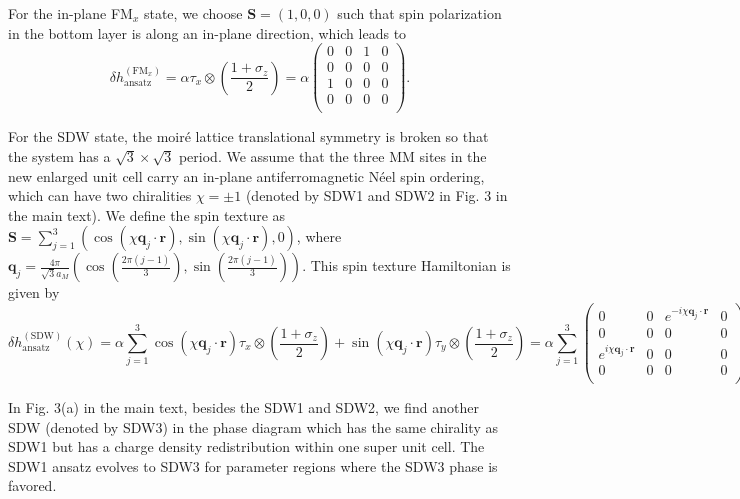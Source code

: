 \documentclass[aps,prl,onecolumn,superscriptaddress,longbibliography]{revtex4-2}
\begin{document}
For the in-plane FM$_x$ state,  we choose $ \bm{S}=\left( 1,0,0 \right)$ such that spin polarization in the bottom layer is along an in-plane direction, which leads to
\begin{equation}
    \delta h_{\text{ansatz}}^{(\text{FM}_x)}=\alpha \tau_x\otimes \left(\frac{1+\sigma_z}{2}\right)=\alpha 
    \begin{pmatrix}
        0 & 0 & 1 & 0\\
        0 & 0 & 0 & 0\\
        1 & 0 & 0 & 0\\
        0 & 0 & 0 & 0\\
    \end{pmatrix}.
\end{equation}

For the SDW state, the moir\'e lattice translational symmetry is broken so that the system has a $\sqrt{3}\times\sqrt{3}$ period. We assume that the three MM sites in the new enlarged unit cell carry an in-plane antiferromagnetic N\'eel spin ordering, which can have two chiralities $\chi=\pm 1$ (denoted by SDW1 and SDW2 in Fig. 3 in the main text). We define the spin texture as $\bm{S}=\sum_{j=1}^3 \left( \cos(\chi\bm{q}_j \cdot \bm{r}),\sin(\chi\bm{q}_j \cdot \bm{r}),0 \right)$, where $\bm{q}_j=\frac{4\pi}{\sqrt{3}a_M} \left( \cos(\frac{2\pi(j-1)}{3}), \sin(\frac{2\pi(j-1)}{3}) \right)$.
This spin texture Hamiltonian is given by 
\begin{equation}\label{eq:Hansatz}
    \delta h_{\text{ansatz}}^{(\text{SDW})}(\chi)=\alpha\sum_{j=1}^3 \cos(\chi\bm{q}_j\cdot \bm{r})\tau_x \otimes \left(\frac{1+\sigma_z}{2}\right) + \sin(\chi\bm{q}_j\cdot \bm{r})\tau_y \otimes \left(\frac{1+\sigma_z}{2}\right) = \alpha\sum_{j=1}^3 
    \begin{pmatrix}
        0 & 0 & e^{-i\chi \bm{q}_{j}\cdot \bm{r}} & 0\\
        0 & 0 & 0 & 0\\
        e^{i\chi \bm{q}_{j}\cdot \bm{r}} & 0 & 0 & 0\\
        0 & 0 & 0 & 0\\
    \end{pmatrix}.
\end{equation}

In Fig. 3(a) in the main text, besides the SDW1 and SDW2, we find another SDW (denoted by SDW3) in the phase diagram which has the same chirality as SDW1 but has a charge density redistribution within one super unit cell. The SDW1 ansatz evolves to SDW3 for parameter regions where the SDW3 phase is favored.
\end{document}
